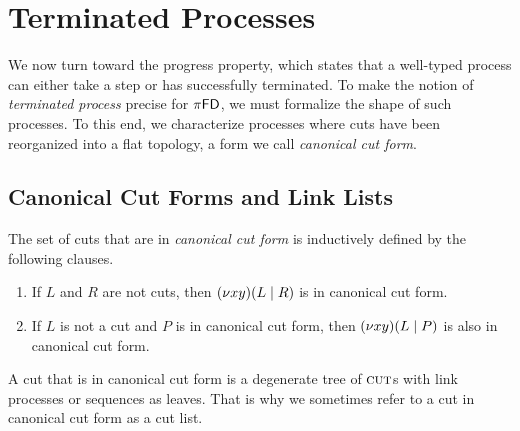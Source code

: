 \section{Terminated Processes}
We now turn toward the progress property, which states that a well-typed
process can either take a step or has successfully terminated. To make the
notion of \emph{terminated process} precise for $\pi\textsf{FD}$, we must formalize
the shape of such processes. To this end, we characterize processes
where cuts have been reorganized into a flat topology, a form we call
\emph{canonical cut form}.

\subsection{Canonical Cut Forms and Link Lists}
\begin{definition} \label{def:canonical-cut-form}
  The set of cuts that are in \emph{canonical cut form} is inductively defined by the following clauses.
  \begin{enumerate}[label=(\roman*)]
    \item If $L$ and $R$ are not cuts, then
          $(\nu x y)(L \mid R)$ is in canonical cut form.
    \item If $L$ is not a cut and $P$ is in canonical cut form,
          then $(\nu x y)(L \mid P)$ is also in canonical cut form.
  \end{enumerate}
\end{definition}

\begin{remark}
  A cut that is in canonical cut form is a degenerate tree of $\textsc{cut}$s
  with link processes or sequences as leaves. That is why we sometimes refer
  to a cut in canonical cut form as a cut list.
\end{remark}

